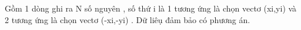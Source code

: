 Gồm 1 dòng ghi ra N số nguyên , số thứ i là 1 tương ứng là chọn vectơ (xi,yi) và 2 tương ứng là chọn vectơ (-xi,-yi) . Dữ liêụ đảm bảo có phương án.